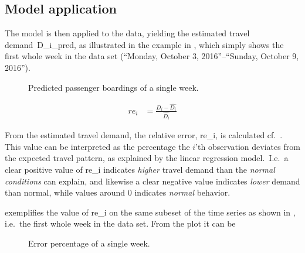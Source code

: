 \subsection{Model application}
The model is then applied to the data, yielding the estimated travel demand~\gls{D_i_pred}, as illustrated in the example in , which simply shows the first whole week in the data set (``Monday, October 3, 2016''--``Sunday, October 9, 2016'').
\begin{figure}[!ht]
    \center
    
    \vspace{-1em}
    \caption{Predicted passenger boardings of a single week.}
    \label{fig:travelcard_pred}
\end{figure}

\begin{align}
    \mathit{re}_i &= \frac{D_i - \widehat{D_i}}{\widehat{D_i}}
    \label{eq:error}
\end{align}

From the estimated travel demand, the relative error, \gls{re_i}, is calculated cf.~. This value can be interpreted as the percentage the $i$'th observation deviates from the expected travel pattern, as explained by the linear regression model.\ I.e.\ a clear positive value of \gls{re_i} indicates \emph{higher} travel demand than the \emph{normal conditions} can explain, and likewise a clear negative value indicates \emph{lower} demand than normal, while values around 0 indicates \emph{normal} behavior.


 exemplifies the value of \gls{re_i} on the same subeset of the time series as shown in , i.e.\ the first whole week in the data set. From the plot it can be 

\begin{figure}[!ht]
    \center
    
    \vspace{-1em}
    \caption{Error percentage of a single week.}
    \label{fig:travelcard_error_pct}
\end{figure}